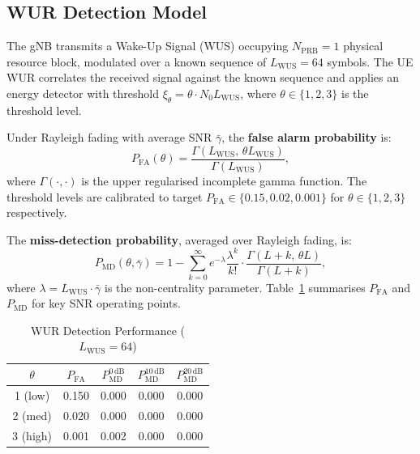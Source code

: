 \documentclass[conference]{IEEEtran}
\begin{document}
\subsection{WUR Detection Model}

The gNB transmits a Wake-Up Signal (WUS) occupying $N_{\mathrm{PRB}} = 1$
physical resource block, modulated over a known sequence of
$L_{\mathrm{WUS}} = 64$ symbols.
The UE WUR correlates the received signal against the known sequence and
applies an energy detector with threshold $\xi_\theta = \theta \cdot N_0 L_{\mathrm{WUS}}$,
where $\theta \in \{1, 2, 3\}$ is the threshold level.

Under Rayleigh fading with average SNR $\bar{\gamma}$, the
\textbf{false alarm probability} is:
\begin{equation}
  P_{\mathrm{FA}}(\theta) = \frac{\Gamma(L_{\mathrm{WUS}},\, \theta L_{\mathrm{WUS}})}
                                  {\Gamma(L_{\mathrm{WUS}})},
  \label{eq:pfa}
\end{equation}
where $\Gamma(\cdot, \cdot)$ is the upper regularised incomplete gamma function.
The threshold levels are calibrated to target $P_{\mathrm{FA}} \in \{0.15, 0.02, 0.001\}$
for $\theta \in \{1, 2, 3\}$ respectively.

The \textbf{miss-detection probability}, averaged over Rayleigh fading, is:
\begin{equation}
  P_{\mathrm{MD}}(\theta, \bar{\gamma}) = 1 -
    \sum_{k=0}^{\infty} e^{-\lambda} \frac{\lambda^k}{k!}
    \cdot \frac{\Gamma(L + k,\, \theta L)}{\Gamma(L + k)},
  \label{eq:pmd}
\end{equation}
where $\lambda = L_{\mathrm{WUS}} \cdot \bar{\gamma}$ is the
non-centrality parameter.
Table~\ref{tab:wur} summarises $P_{\mathrm{FA}}$ and $P_{\mathrm{MD}}$
for key SNR operating points.

\begin{table}[t]
  \centering
  \caption{WUR Detection Performance ($L_{\mathrm{WUS}} = 64$)}
  \label{tab:wur}
  \begin{tabular}{ccccc}
    \toprule
    $\theta$ & $P_{\mathrm{FA}}$ &
    $P_{\mathrm{MD}}^{0\,\mathrm{dB}}$ &
    $P_{\mathrm{MD}}^{10\,\mathrm{dB}}$ &
    $P_{\mathrm{MD}}^{20\,\mathrm{dB}}$ \\
    \midrule
    1 (low)  & 0.150 & 0.000 & 0.000 & 0.000 \\
    2 (med)  & 0.020 & 0.000 & 0.000 & 0.000 \\
    3 (high) & 0.001 & 0.002 & 0.000 & 0.000 \\
    \bottomrule
  \end{tabular}
\end{table}
\end{document}
